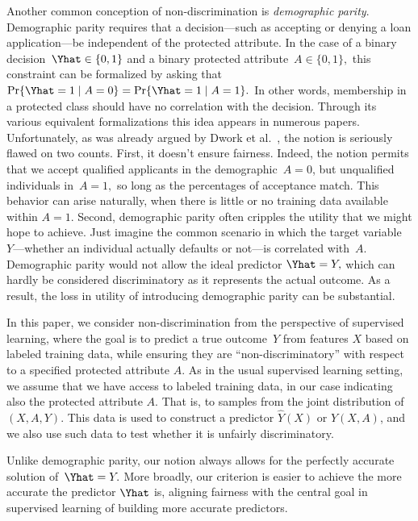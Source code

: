 Another common conception of non-discrimination is \emph{demographic parity}.
Demographic parity requires that a decision---such as accepting or denying a
loan application---be independent of the protected attribute. In the case of a
binary decision~$\Yhat\in\{0,1\}$ and a binary protected
attribute~$A\in\{0,1\},$ this constraint can be formalized by asking that
$\Pr\{\Yhat=1\mid A=0\}=\Pr\{\Yhat=1\mid A=1\}.$ In other words, membership in a
protected class should have no correlation with the decision. Through its
various equivalent formalizations this idea appears in numerous papers.
Unfortunately, as was already argued by Dwork et al.~\cite{DworkHPRZ12}, the
notion is seriously flawed on two counts. First, it doesn't ensure fairness.
Indeed, the notion permits that we accept qualified applicants in the
demographic~$A=0$, but unqualified individuals in~$A=1,$ so long as the
percentages of acceptance match. This behavior can arise naturally, when there
is little or no training data available within $A=1.$ Second, demographic parity
often cripples the utility that we might hope to achieve. Just imagine the
common scenario in which the target variable~$Y$---whether an individual
actually defaults or not---is correlated with~$A.$ Demographic parity would not
allow the ideal predictor $\Yhat = Y,$ which can hardly be considered
discriminatory as it represents the actual outcome. As a result, the loss in
utility of introducing demographic parity can be substantial.

In this paper, we consider non-discrimination from the perspective of supervised
learning, where the goal is to predict a true outcome~$Y$ from features $X$
based on labeled training data, while ensuring they are ``non-discriminatory''
with respect to a specified protected attribute $A$. As in the usual supervised
learning setting, we assume that we have access to labeled training data, in our
case indicating also the protected attribute $A$. That is, to samples from the
joint distribution of $(X,A,Y)$. This data is used to construct a predictor
$\hat{Y}(X)$ or $\hat{Y}(X,A)$, and we also use such data to test whether it is
unfairly discriminatory.

Unlike demographic parity, our notion always allows for the perfectly accurate
solution of~$\Yhat = Y.$ More broadly, our criterion is easier to achieve the more
accurate the predictor $\Yhat$ is, aligning fairness with the central goal in
supervised learning of building more accurate predictors.

